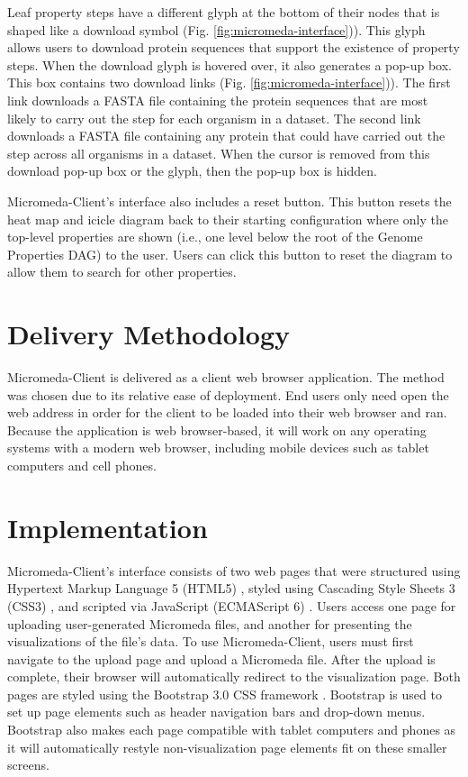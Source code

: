 Leaf property steps have a different glyph at the bottom of their nodes that is shaped like a download symbol (Fig. \ref{fig:micromeda-interface})). This glyph allows users to download protein sequences that support the existence of property steps. When the download glyph is hovered over, it also generates a pop-up box. This box contains two download links (Fig. \ref{fig:micromeda-interface})). The first link downloads a FASTA file containing the protein sequences that are most likely to carry out the step for each organism in a dataset. The second link downloads a FASTA file containing any protein that could have carried out the step across all organisms in a dataset. When the cursor is removed from this download pop-up box or the glyph, then the pop-up box is hidden.

Micromeda-Client's interface also includes a reset button. This button resets the heat map and icicle diagram back to their starting configuration where only the top-level properties are shown (i.e., one level below the root of the Genome Properties DAG) to the user. Users can click this button to reset the diagram to allow them to search for other properties.

\section{Delivery Methodology} \label{client-delivery-method}

Micromeda-Client is delivered as a client web browser application. The method was chosen due to its relative ease of deployment. End users only need open the web address in order for the client to be loaded into their web browser and ran. Because the application is web browser-based, it will work on any operating systems with a modern web browser, including mobile devices such as tablet computers and cell phones.

\section{Implementation} \label{client-implementation}

Micromeda-Client's interface consists of two web pages that were structured using Hypertext Markup Language 5 (HTML5) \cite{HTML5}, styled using Cascading Style Sheets 3 (CSS3) \cite{CSS3}, and scripted via JavaScript (ECMAScript 6) \cite{flanagan2006javascript}. Users access one page for uploading user-generated Micromeda files, and another for presenting the visualizations of the file's data. To use Micromeda-Client, users must first navigate to the upload page and upload a Micromeda file. After the upload is complete, their browser will automatically redirect to the visualization page. Both pages are styled using the Bootstrap 3.0 CSS framework \cite{spurlock2013bootstrap}. Bootstrap is used to set up page elements such as header navigation bars and drop-down menus. Bootstrap also makes each page compatible with tablet computers and phones as it will automatically restyle non-visualization page elements fit on these smaller screens.

